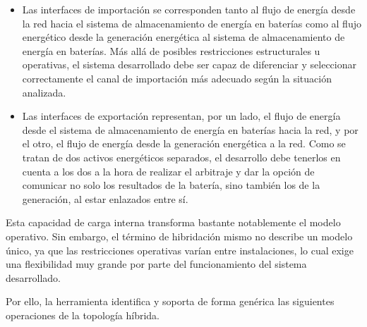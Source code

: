 \begin{itemize}

  \item Las interfaces de importación se corresponden tanto al flujo de energía desde la red hacia el sistema de almacenamiento de energía en baterías como al flujo energético desde la generación energética al sistema de almacenamiento de energía en baterías. Más allá de posibles restricciones estructurales u operativas, el sistema desarrollado debe ser capaz de diferenciar y seleccionar correctamente el canal de importación más adecuado según la situación analizada.

  \item Las interfaces de exportación representan, por un lado, el flujo de energía desde el sistema de almacenamiento de energía en baterías hacia la red, y por el otro, el flujo de energía desde la generación energética a la red. Como se tratan de dos activos energéticos separados, el desarrollo debe tenerlos en cuenta a los dos a la hora de realizar el arbitraje y dar la opción de comunicar no solo los resultados de la batería, sino también los de la generación, al estar enlazados entre sí.

\end{itemize}

Esta capacidad de carga interna transforma bastante notablemente el modelo operativo. Sin embargo, el término de hibridación mismo no describe un modelo único, ya que las restricciones operativas varían entre instalaciones, lo cual exige una flexibilidad muy grande por parte del funcionamiento del sistema desarrollado.

Por ello, la herramienta identifica y soporta de forma genérica las siguientes operaciones de la topología híbrida.

